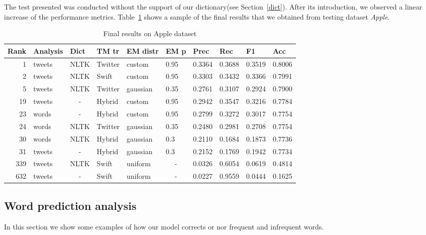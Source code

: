 \documentclass[12pt]{article}
\begin{document}
The test presented was conducted without the support of our dictionary(see
Section~\ref{dict}). After its introduction, we observed a linear increase of
the performance metrics. Table~\ref{tab:final} shows a sample of the final
results that we obtained from testing dataset \emph{Apple}.

\begin{table}[htbp]
  \centering
    \begin{tabular}{rlllllllll}
    \toprule
    \textbf{Rank} & \textbf{Analysis} & \textbf{Dict} & \textbf{TM tr} & \textbf{EM distr} & \textbf{EM p} & \textbf{Prec} & \textbf{Rec} & \textbf{F1} & \textbf{Acc} \\
    \midrule
    1     & tweets & NLTK  & Twitter & custom & 0.95  & 0.3364 & 0.3688 & 0.3519
    & 0.8006 \\
    2     & tweets & NLTK  & Swift & custom & 0.95  & 0.3303 & 0.3432 & 0.3366 &
    0.7991 \\
    5     & tweets & NLTK  & Twitter & gaussian & 0.35 & 0.2761 & 0.3107 &
    0.2924 & 0.7900\\
    19    & tweets & \multicolumn{1}{c}{-} & Hybrid & custom & 0.95  & 0.2942 &
    0.3547 & 0.3216 & 0.7784 \\
    23    & words & \multicolumn{1}{c}{-} & Hybrid & custom & 0.95  & 0.2799 &
    0.3272 & 0.3017 & 0.7754 \\
    24    & words & NLTK  & Twitter & gaussian & 0.35  & 0.2480 & 0.2981 &
    0.2708 & 0.7754 \\
    30    & words & NLTK  & Hybrid & gaussian & 0.3   & 0.2110 & 0.1684 & 0.1873
    & 0.7736 \\
    31    & tweets & \multicolumn{1}{c}{-} & Hybrid & gaussian & 0.3   & 0.2152
    & 0.1769 & 0.1942 & 0.7734 \\
    339   & tweets & NLTK  & Swift & uniform & \multicolumn{1}{c}{-} & 0.0326 &
    0.6054 & 0.0619 & 0.4814 \\
    632   & tweets & \multicolumn{1}{c}{-} & Swift & uniform &
    \multicolumn{1}{c}{-} & 0.0227 & 0.9559 & 0.0444 & 0.1625 \\
    \bottomrule
    \end{tabular}%
    \caption{Final results on Apple dataset}
  \label{tab:final}%
\end{table}%

\subsection{Word prediction analysis}
In this section we show some examples of how our model corrects or nor frequent
and infrequent words.
\end{document}
